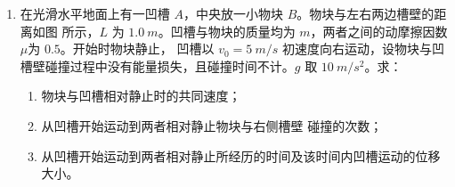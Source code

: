 \begin{enumerate}





\newpage
\item
{}
在光滑水平地面上有一凹槽 $ A $，中央放一小物块 $ B $。物块与左右两边槽壁的距离如图
所示，$ L $ 为 $ 1.0 \ m $。凹槽与物块的质量均为 $ m $，两者之间的动摩擦因数$ \mu $为 $ 0.5 $。开始时物块静止，
凹槽以 $ v_{0} =5 \ m/s $ 初速度向右运动，设物块与凹槽壁碰撞过程中没有能量损失，且碰撞时间不计。$ g $
取 $ 10 \ m/s^{2} $。求：
\begin{enumerate}
\renewcommand{\labelenumi}{\arabic{enumi}.}
\item
物块与凹槽相对静止时的共同速度；

\item 
从凹槽开始运动到两者相对静止物块与右侧槽壁
碰撞的次数；
\item 
从凹槽开始运动到两者相对静止所经历的时间及该时间内凹槽运动的位移大小。



\end{enumerate}
\begin{figure}[h!]
\flushright

\end{figure}


\end{enumerate}

